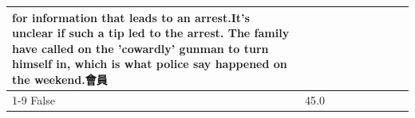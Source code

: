 \begin{table}[H]
\begin{tabular}{lllrlllll}
for information that leads to an arrest.It's unclear if such a tip led to the arrest. The family have called on the 'cowardly' gunman to turn himself in, which is what police say happened on the weekend.會員 \\
\cline{1-9}
False & 45.0%
\end{tabular}
\end{table}

